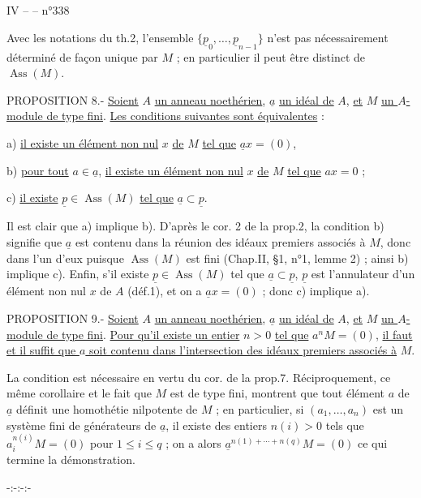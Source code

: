 
IV --  -- \hfill n°338

Avec les notations du th.2, l'ensemble $\{\underline p_0,\ldots,\underline p_{n-1}\}$ n'est pas nécessairement déterminé de façon unique par $M$ ; en particulier il peut être distinct de $\operatorname{Ass}(M)$.

PROPOSITION 8.- \uline{Soient} $A$ \uline{un anneau noethérien}, $\underline a$ \uline{un idéal de} $A$, \uline{et} $M$ \uline{un $A$-module de type fini}. \uline{Les conditions suivantes sont équivalentes} :

a) \uline{il existe un élément non nul} $x$ \uline{de} $M$ \uline{tel que} $\underline ax=(0)$,

b) \uline{pour tout} $a\in\underline a$, \uline{il existe un élément non nul} $x$ \uline{de} $M$ \uline{tel que} $ax=0$ ;

c) \uline{il existe} $\underline p\in\operatorname{Ass}(M)$ \uline{tel que} $\underline a\subset\underline p$.

Il est clair que a) implique b). D'après le cor. 2 de la prop.2, la condition b) signifie que $\underline a$ est contenu dans la réunion des idéaux premiers associés à $M$, donc dans l'un d'eux puisque $\operatorname{Ass}(M)$ est fini (Chap.II, §1, n°1, lemme 2) ; ainsi b) implique c). Enfin, s'il existe $\underline p\in\operatorname{Ass}(M)$ tel que $\underline a\subset\underline p$, $\underline p$ est l'annulateur d'un élément non nul $x$ de $A$ (déf.1), et on a $\underline ax=(0)$ ; donc c) implique a).

PROPOSITION 9.- \uline{Soient} $A$ \uline{un anneau noethérien}, $\underline a$ \uline{un idéal de} $A$, \uline{et} $M$ \uline{un $A$-module de type fini}. \uline{Pour qu'il existe un entier} $n>0$ \uline{tel que} $a^nM=(0)$, \uline{il faut et il suffit que $a$ soit contenu dans l'intersection des idéaux premiers associés à} $M$.

La condition est nécessaire en vertu du cor. de la prop.7. Réciproquement, ce même corollaire et le fait que $M$ est de type fini, montrent que tout élément $a$ de $\underline a$ définit une homothétie nilpotente de $M$ ; en particulier, si $(a_1,\ldots,a_n)$ est un système fini de générateurs de $\underline a$, il existe des entiers $n(i)>0$ tels que $a_i^{n(i)}M=(0)$ pour $1\leq i\leq q$ ; on a alors $\underline a^{n(1)+\cdots+n(q)}M=(0)$ ce qui termine la démonstration.

\begin{center}-:-:-:-\end{center}

